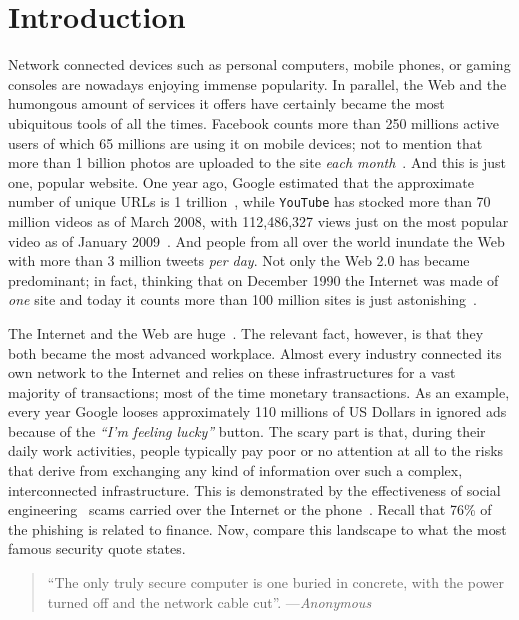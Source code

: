 \chapter{Introduction}
\label{introduction}

Network connected devices such as personal computers, mobile phones, or gaming consoles are nowadays enjoying immense popularity. In parallel, the Web and the humongous amount of services it offers have certainly became the most ubiquitous tools of all the times. \textsf{Facebook} counts more than 250 millions active users of which 65 millions are using it on mobile devices; not to mention that more than 1 billion photos are uploaded to the site \emph{each   month}~\citep{facebook-stats}. And this is just one, popular website. One year ago, \textsf{Google} estimated that the approximate number of unique \acp{URL} is 1 trillion~\citep{google-is-big}, while \texttt{YouTube} has stocked more than 70 million videos as of March 2008, with 112,486,327 views just on the most popular video as of January 2009~\citep{social-media-stats}. And people from all over the world inundate the Web with more than 3 million tweets \emph{per day}. Not only the Web 2.0 has became predominant; in fact, thinking that on December 1990 the Internet was made of \emph{one} site and today it counts more than 100 million sites is just astonishing~\citep{internet-timeline}.

The Internet and the Web are huge~\citep{inetworldstats}. The relevant fact, however, is that they both became the most advanced workplace. Almost every industry connected its own network to the Internet and relies on these infrastructures for a vast majority of transactions; most of the time monetary transactions. As an example, every year \textsf{Google} looses approximately 110 millions of US Dollars in ignored ads because of the \emph{``I'm feeling lucky''} button. The scary part is that, during their daily work activities, people typically pay poor or no attention at all to the risks that derive from exchanging any kind of information over such a complex, interconnected infrastructure. This is demonstrated by the effectiveness of social engineering~\citep{deception} scams carried over the Internet or the phone~\citep{social-engineering-fundamentals}. Recall that 76\% of the phishing is related to finance. Now, compare this landscape to what the most famous security quote states.

\begin{quotation}
  ``The only truly secure computer is one buried in concrete, with the   power turned off and the network cable cut''.
   ---\emph{Anonymous}
\end{quotation}

